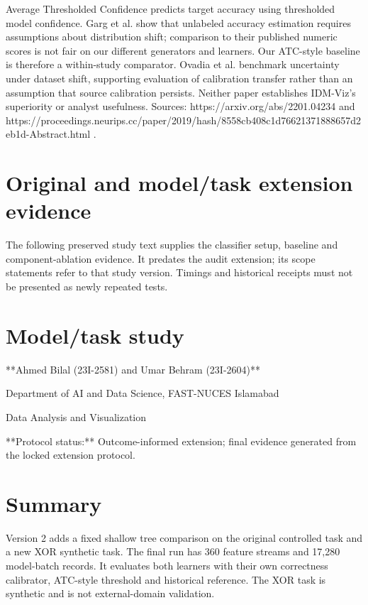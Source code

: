 \documentclass[11pt,a4paper]{article}
\begin{document}
Average Thresholded Confidence predicts target accuracy using thresholded model confidence. Garg et al. show that unlabeled accuracy estimation requires assumptions about distribution shift; comparison to their published numeric scores is not fair on our different generators and learners. Our ATC-style baseline is therefore a within-study comparator. Ovadia et al. benchmark uncertainty under dataset shift, supporting evaluation of calibration transfer rather than an assumption that source calibration persists. Neither paper establishes IDM-Viz's superiority or analyst usefulness. Sources: https://arxiv.org/abs/2201.04234 and https://proceedings.neurips.cc/paper/2019/hash/8558cb408c1d76621371888657d2eb1d-Abstract.html .\par

\section{Original and model/task extension evidence}

The following preserved study text supplies the classifier setup, baseline and component-ablation evidence. It predates the audit extension; its scope statements refer to that study version. Timings and historical receipts must not be presented as newly repeated tests.\par



\section{Model/task study}


**Ahmed Bilal (23I-2581) and Umar Behram (23I-2604)**\par
Department of AI and Data Science, FAST-NUCES Islamabad\par
Data Analysis and Visualization\par

**Protocol status:** Outcome-informed extension; final evidence generated from the locked extension protocol.\par

\section{Summary}

Version 2 adds a fixed shallow tree comparison on the original controlled task and a new XOR synthetic task. The final run has 360 feature streams and 17,280 model-batch records. It evaluates both learners with their own correctness calibrator, ATC-style threshold and historical reference. The XOR task is synthetic and is not external-domain validation.\par
\end{document}
